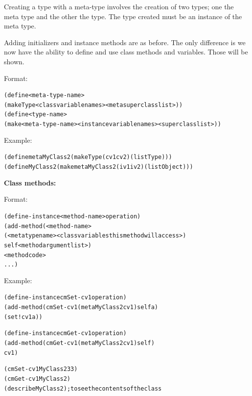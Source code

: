 \documentclass[12pt]{article}
\begin{document}
Creating a type with a meta-type involves the creation of two types; one the meta type and the other the type.
The type created must be an instance of the meta type.

Adding initializers and instance methods are as before.  The only difference is we now have the ability
to define and use class methods and variables.  Those will be shown.

Format:

\begin{alltt}
   (define <meta-type-name>
           (make Type <class variable names> <meta superclass list>))
   (define <type-name>
           (make <meta-type-name>  <instance variable names>  <superclass list>))
\end{alltt}

Example:

\begin{alltt}
    (define metaMyClass2 (make Type (cv1 cv2) (list Type)))
    (define MyClass2 (make metaMyClass2 (iv1 iv2) (list Object)))
\end{alltt}

\textbf{Class methods:}

Format:

\begin{alltt}
   (define-instance <method-name> operation)
   (add-method (<method-name>
                     (<meta type name>  <class variables this method will access>)
                     self  <method argument list>)
               <method code>
               ...)
\end{alltt}

\newpage

Example:

\begin{alltt}
   (define-instance cmSet-cv1 operation)
   (add-method (cmSet-cv1 (metaMyClass2 cv1) self a)
               (set! cv1 a))
  
   (define-instance cmGet-cv1 operation)
   (add-method (cmGet-cv1 (metaMyClass2 cv1) self)
               cv1)

   (cmSet-cv1 MyClass2 33)
   (cmGet-cv1 MyClass2)
   (describe MyClass2)  ; to see the contents of the class
\end{alltt}


\label{lastpage}
\end{document}
